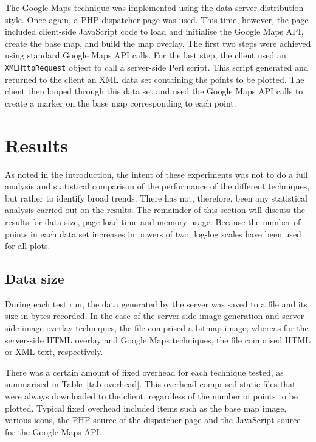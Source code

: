 \documentclass[acmnow]{acmtrans2m}
\begin{document}
The Google Maps technique was implemented using the data server
distribution style. Once again, a PHP dispatcher page was used. This
time, however, the page included client-side JavaScript code to load and
initialise the Google Maps API, create the base map, and build the map
overlay. The first two steps were achieved using standard Google Maps
API calls. For the last step, the client used an \texttt{XMLHttpRequest}
object to call a server-side Perl script. This script generated and
returned to the client an XML data set containing the points to be
plotted. The client then looped through this data set and used the
Google Maps API calls to create a marker on the base map corresponding
to each point.


\section{Results}
\label{sec-results}

As noted in the introduction, the intent of these experiments was not to
do a full analysis and statistical comparison of the performance of the
different techniques, but rather to identify broad trends. There has
not, therefore, been any statistical analysis carried out on the
results. The remainder of this section will discuss the results for data
size, page load time and memory usage. Because the number of points in
each data set increases in powers of two, log-log scales have been used
for all plots.


\subsection{Data size}

During each test run, the data generated by the server was saved to a
file and its size in bytes recorded. In the case of the server-side
image generation and server-side image overlay techniques, the file
comprised a bitmap image; whereas for the server-side HTML overlay and
Google Maps techniques, the file comprised HTML or XML text,
respectively.

There was a certain amount of fixed overhead for each technique tested,
as summarised in Table~\ref{tab-overhead}. This overhead comprised
static files that were always downloaded to the client, regardless of
the number of points to be plotted. Typical fixed overhead included
items such as the base map image, various icons, the PHP source of the
dispatcher page and the JavaScript source for the Google Maps API.
\end{document}
